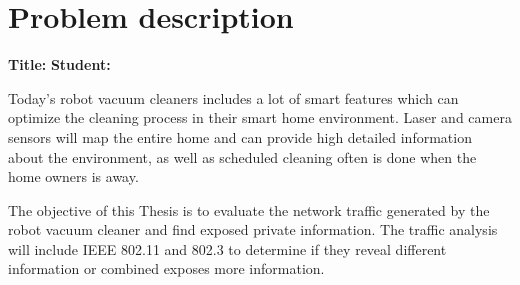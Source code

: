 \chapter*{Problem description}


\textbf{Title:}
\newline
\textbf{Student:}
\newline
\newline

Today's robot vacuum cleaners includes a lot of smart features which can optimize the cleaning process in their smart home environment. Laser and camera sensors will map the entire home and can provide high detailed information about the environment, as well as scheduled cleaning often is done when the home owners is away.

The objective of this Thesis is to evaluate the network traffic generated by the robot vacuum cleaner and find exposed private information. The traffic analysis will include IEEE 802.11 and 802.3 to determine if they reveal different information or combined exposes more information.



